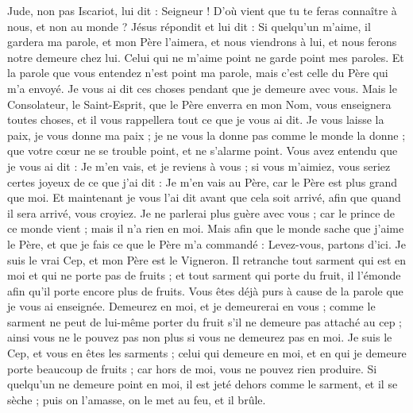 \begin{multicols}{2}
Jude, non pas Iscariot, lui dit : Seigneur ! D'où vient que tu te feras connaître à nous, et non au monde ?
Jésus répondit et lui dit : Si quelqu'un m'aime, il gardera ma parole, et mon Père l'aimera, et nous viendrons à lui, et nous ferons notre demeure chez lui.
Celui qui ne m'aime point ne garde point mes paroles. Et la parole que vous entendez n'est point ma parole, mais c'est celle du Père qui m'a envoyé.
Je vous ai dit ces choses pendant que je demeure avec vous.
Mais le Consolateur, le Saint-Esprit, que le Père enverra en mon Nom, vous enseignera toutes choses, et il vous rappellera tout ce que je vous ai dit.
Je vous laisse la paix, je vous donne ma paix ; je ne vous la donne pas comme le monde la donne ; que votre cœur ne se trouble point, et ne s'alarme point.
Vous avez entendu que je vous ai dit : Je m'en vais, et je reviens à vous ; si vous m'aimiez, vous seriez certes joyeux de ce que j'ai dit : Je m'en vais au Père, car le Père est plus grand que moi.
Et maintenant je vous l'ai dit avant que cela soit arrivé, afin que quand il sera arrivé, vous croyiez.
Je ne parlerai plus guère avec vous ; car le prince de ce monde vient ; mais il n'a rien en moi.
Mais afin que le monde sache que j'aime le Père, et que je fais ce que le Père m'a commandé : Levez-vous, partons d'ici.
\VerseOne{}Je suis le vrai Cep, et mon Père est le Vigneron.
Il retranche tout sarment qui est en moi et qui ne porte pas de fruits ; et tout sarment qui porte du fruit, il l'émonde afin qu'il porte encore plus de fruits.
Vous êtes déjà purs à cause de la parole que je vous ai enseignée.
Demeurez en moi, et je demeurerai en vous ; comme le sarment ne peut de lui-même porter du fruit s'il ne demeure pas attaché au cep ; ainsi vous ne le pouvez pas non plus si vous ne demeurez pas en moi.
Je suis le Cep, et vous en êtes les sarments ; celui qui demeure en moi, et en qui je demeure porte beaucoup de fruits ; car hors de moi, vous ne pouvez rien produire.
Si quelqu'un ne demeure point en moi, il est jeté dehors comme le sarment, et il se sèche ; puis on l'amasse, on le met au feu, et il brûle.

\end{multicols}
